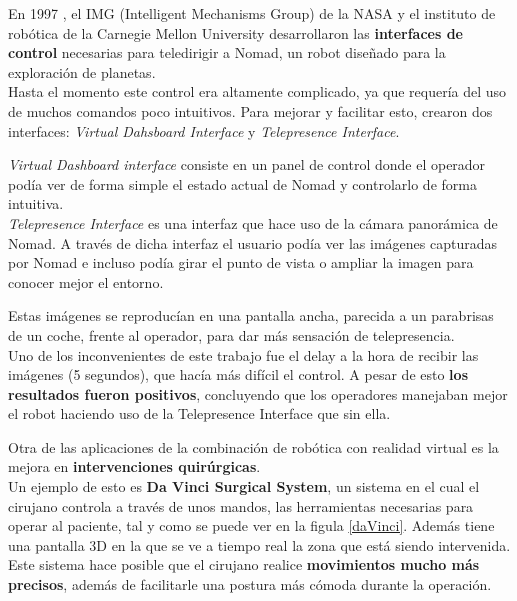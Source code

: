 \documentclass[twoside, 11pt]{epstfg}
\begin{document}
En 1997 , el IMG (Intelligent Mechanisms Group) de la NASA y el instituto de robótica de la Carnegie Mellon University desarrollaron las \textbf{interfaces de control} necesarias para teledirigir a Nomad, un robot diseñado para la exploración de planetas. \cite{Nguyen2001}\\
Hasta el momento este control era altamente complicado, ya que requería del uso de muchos comandos poco intuitivos. Para mejorar y facilitar esto, crearon dos interfaces:\textit{ Virtual Dahsboard Interface} y \textit{Telepresence Interface}.

\textit{Virtual Dashboard interface} consiste en un panel de control donde el operador podía ver de forma simple el estado actual de Nomad y controlarlo de forma intuitiva.\\
\textit{Telepresence Interface} es una interfaz que hace uso de la cámara panorámica de Nomad. A través de dicha interfaz el usuario podía ver las imágenes capturadas por Nomad e incluso podía girar el punto de vista o ampliar la imagen para conocer mejor el entorno.

Estas imágenes se reproducían en una pantalla ancha, parecida a un parabrisas de un coche, frente al operador, para dar más sensación de telepresencia.\\
Uno de los inconvenientes de este trabajo fue el delay a la hora de recibir las imágenes (5 segundos), que hacía más difícil el control.
A pesar de esto \textbf{los resultados fueron positivos}, concluyendo que los operadores manejaban mejor el robot haciendo uso de la Telepresence Interface que sin ella.

Otra de las aplicaciones de la combinación de robótica con realidad virtual es la mejora en \textbf{intervenciones quirúrgicas}.\\
Un ejemplo de esto es \textbf{Da Vinci Surgical System}, un sistema en el cual el cirujano controla a través de unos mandos, las herramientas necesarias para operar al paciente, tal y como se puede ver en la figula \ref{daVinci}. Además tiene una pantalla 3D en la que se ve a tiempo real la zona que está siendo intervenida.
Este sistema hace posible que el cirujano realice \textbf{movimientos mucho más precisos}, además de facilitarle una postura más cómoda durante la operación. \cite{Hubens2003}
\end{document}
